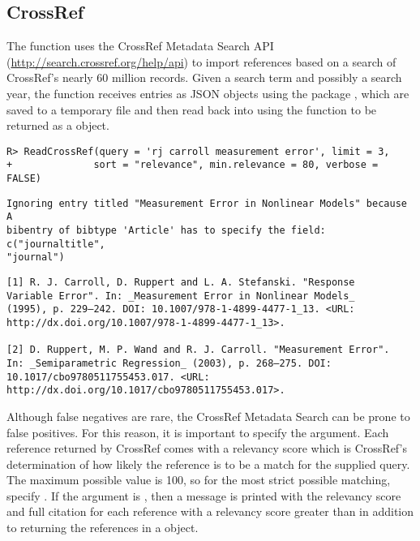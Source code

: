 \documentclass[article]{jss}\usepackage[]{graphicx}\usepackage[]{color}
\makeatletter
\newenvironment{kframe}{%
 \def\at@end@of@kframe{}%
 \ifinner\ifhmode%
  \def\at@end@of@kframe{\end{minipage}}%
  \begin{minipage}{\columnwidth}%
 \fi\fi%
 \def\FrameCommand##1{\hskip\@totalleftmargin \hskip-\fboxsep
 \colorbox{shadecolor}{##1}\hskip-\fboxsep
     \hskip-\linewidth \hskip-\@totalleftmargin \hskip\columnwidth}%
 \MakeFramed {\advance\hsize-\width
   \@totalleftmargin\z@ \linewidth\hsize
   \@setminipage}}%
 {\par\unskip\endMakeFramed%
 \at@end@of@kframe}
\newenvironment{knitrout}{}{} %
\makeatother
\begin{document}
\subsection{CrossRef}
The function  uses the CrossRef Metadata Search API (\url{http://search.crossref.org/help/api}) to import references based on a search of CrossRef's nearly 60 million records.  Given a search term and possibly a search year, the function receives \Bibtex{} entries as JSON objects using the  package \citep{RJSONIO}, which are saved to a temporary file and then read back into \R{} using the  function to be returned as a  object.
\begin{knitrout}
\color{fgcolor}\begin{kframe}
\begin{verbatim}
R> ReadCrossRef(query = 'rj carroll measurement error', limit = 3, 
+              sort = "relevance", min.relevance = 80, verbose = FALSE)
\end{verbatim}
\begin{lstlisting}[style=output,showstringspaces=false]
Ignoring entry titled "Measurement Error in Nonlinear Models" because A 
bibentry of bibtype 'Article' has to specify the field: c("journaltitle", 
"journal")
\end{lstlisting}\begin{verbatim}
[1] R. J. Carroll, D. Ruppert and L. A. Stefanski. "Response
Variable Error". In: _Measurement Error in Nonlinear Models_
(1995), p. 229–242. DOI: 10.1007/978-1-4899-4477-1_13. <URL:
http://dx.doi.org/10.1007/978-1-4899-4477-1_13>.

[2] D. Ruppert, M. P. Wand and R. J. Carroll. "Measurement Error".
In: _Semiparametric Regression_ (2003), p. 268–275. DOI:
10.1017/cbo9780511755453.017. <URL:
http://dx.doi.org/10.1017/cbo9780511755453.017>.
\end{verbatim}
\end{kframe}
\end{knitrout}


Although false negatives are rare, the CrossRef Metadata Search can be prone to false positives.  For this reason, it is important to specify the  argument.  Each reference returned by CrossRef comes with a relevancy score which is CrossRef's determination of how likely the reference is to be a match for the supplied query.  The maximum possible value is 100, so for the most strict possible matching, specify .  If the argument  is , then a message is printed with the relevancy score and full citation for each reference with a relevancy score greater than  in addition to returning the references in a  object.
\end{document}
